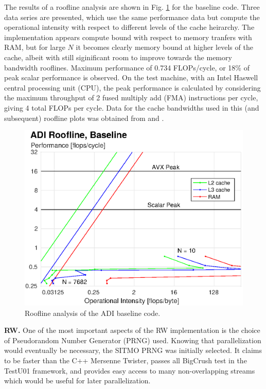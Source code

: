 \documentclass[letterpaper]{article}
\newcommand{\mypar}[1]{{\bf #1.}}
\begin{document}
The results of a roofline analysis are shown in Fig. \ref{fig:roofline_ADI_serial} for the baseline code. Three data series are presented, which use the same performance data but compute the operational intensity with respect to different levels of the cache heirarchy. The implementation appears compute bound with respect to memory tranfers with RAM, but for large $N$ it becomes clearly memory bound at higher levels of the cache, albeit with still siginificant room to improve towards the memory bandwidth rooflines. Maximum performance of 0.734 FLOPs/cycle, or 18\% of peak scalar performance is observed. On the test machine, with an Intel Haswell central processing unit (CPU), the peak performance is calculated by considering the maximum throughput of 2 fused multiply add (FMA) instructions per cycle, giving 4 total FLOPs per cycle. Data for the cache bandwidths used in this (and subsequent) roofline plots was obtained from \cite{7_cpu} and \cite{manual_intel}.

\begin{figure}\centering
  \includegraphics[width=\linewidth]{./plots/roofline_ADI_serial.eps}
  \caption{Roofline analysis of the ADI baseline code.}
  \label{fig:roofline_ADI_serial}
\end{figure}

\mypar{RW}
One of the most important aspects of the RW implementation is the choice of Pseudorandom Number Generator (PRNG) used. Knowing that parallelization would eventually be necessary, the SITMO PRNG \cite{sitmo} was initially selected. It claims to be faster than the C++ Mersenne Twister, passes all BigCrush test in the TestU01 framework, and provides easy access to many non-overlapping streams which would be useful for later parallelization.
\end{document}
